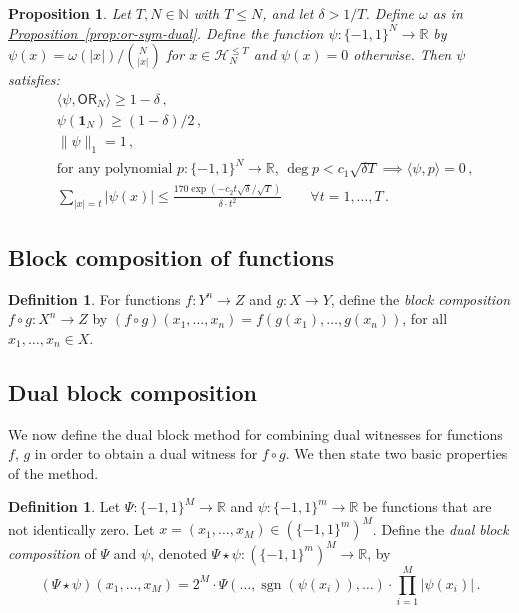 \documentclass[11pt]{article}
\numberwithin{equation}{section}
\newtheorem{proposition}[theorem]{Proposition}
\theoremstyle{definition}
\newtheorem{definition}[theorem]{Definition}
\theoremstyle{plain}
\newcommand{\R}{\mathbb R}
\newcommand{\N}{\mathbb N}
\newcommand{\expref}[2]{\hyperref[#2]{#1~\ref{#2}}}
\newcommand{\sgn}{\mathrm{sign}}
\newcommand{\OR}{\mathsf{ OR}}
\newcommand{\bits}{\{-1,1\}}
\newcommand{\ls}{\star}
\renewcommand{\sgn}{\operatorname{sgn}}
\begin{document}
\begin{proposition} \label{prop:or-dual}
	Let $T, N \in \N$ with $T \le N$, and let $\delta > 1/T$. Define $\omega$ as in \expref{Proposition}{prop:or-sym-dual}. Define the function $\psi: \bits^N \to \R$ by $\psi(x) = \omega(|x|) / {N \choose |x|}$ for $x \in \mathcal{H}_N^{\le T}$ and $\psi(x) = 0$ otherwise. Then $\psi$ satisfies:
	\begin{align} &\langle \psi, \OR_N \rangle \ge 1-\delta\,,  \label{eqn:or-corr} \\
& \psi(\mathbf{1}_{N}) \ge (1-\delta)/2\,, \label{eqn:or-loaded}\\
	& \|\psi\|_1 = 1\,,   \label{eqn:or-norm}\\
%
	& \text{for any polynomial } p \colon \bits^N \to \R\text{, } \deg p < c_1\sqrt{\delta T} \implies \langle \psi, p \rangle = 0\,, \label{eqn:or-phd}\\
	& \sum_{|x|=t} |\psi(x)| \leq \frac{170 \exp(-c_2 t \sqrt{\delta} /  \sqrt{T})}{\delta \cdot t^2} \qquad \forall t = 1, \dots, T\,.\label{eqn:or-decay}
	\end{align}
\end{proposition}

\subsection{Block composition of functions}
\begin{definition}
	For functions $f : Y^n \to Z$ and $g: X \to Y$, define the \emph{block composition} $f \circ g : X^n \to Z$ by $(f\circ g)(x_1, \dots, x_n) = f(g(x_1), \dots, g(x_n))$, for all $x_1, \dots, x_n \in X$.
\end{definition}

\subsection{Dual block composition}
\label{s:dualblockcomposition}
We now define the dual block method \cite{shizhu, lee, sherstovhalfspaces1} for combining dual witnesses for functions $f$, $g$ in order to obtain a dual witness
for $f \circ g$. We then state two basic properties
%
of the method.   %
\label{sec:ls}
\begin{definition}
	Let $\Psi : \bits^M \to \R$ and $\psi : \bits^m \to \R$ be functions that are not identically zero. Let $x=(x_1, \dots, x_M) \in \left(\bits^{m}\right)^M$. Define the \emph{dual block composition} of $\Psi$ and $\psi$, denoted $\Psi \ls \psi : (\bits^m)^M \to \R$, by
	\[(\Psi \ls \psi)(x_1, \dots, x_M) = 2^M \cdot \Psi(\dots, \sgn\left(\psi(x_i)\right), \dots) \cdot \prod_{i = 1}^M |\psi(x_i)|\,.\]
\end{definition}
\end{document}
